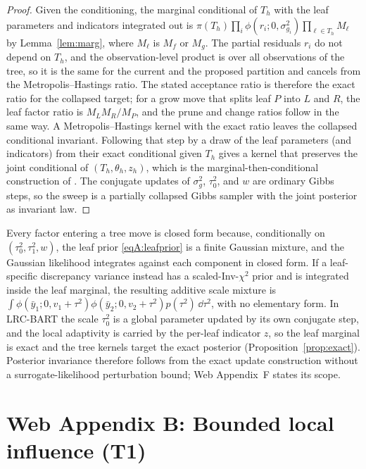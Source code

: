\begin{proof}
Given the conditioning, the marginal conditional of $T_h$ with the leaf parameters and indicators integrated out is $\pi(T_h)\prod_i\phi(r_i;0,\sigma^2_{g_i})\prod_{\ell\in T_h}M_\ell$ by Lemma~\ref{lem:marg}, where $M_\ell$ is $M_f$ or $M_g$. The partial residuals $r_i$ do not depend on $T_h$, and the observation-level product is over all observations of the tree, so it is the same for the current and the proposed partition and cancels from the Metropolis--Hastings ratio. The stated acceptance ratio is therefore the exact ratio for the collapsed target; for a grow move that splits leaf $P$ into $L$ and $R$, the leaf factor ratio is $M_LM_R/M_P$, and the prune and change ratios follow in the same way. A Metropolis--Hastings kernel with the exact ratio leaves the collapsed conditional invariant. Following that step by a draw of the leaf parameters (and indicators) from their exact conditional given $T_h$ gives a kernel that preserves the joint conditional of $(T_h,\theta_h,z_h)$, which is the marginal-then-conditional construction of \citet{Chipman2010BART}. The conjugate updates of $\sigma_g^2$, $\tau_0^2$, and $w$ are ordinary Gibbs steps, so the sweep is a partially collapsed Gibbs sampler with the joint posterior as invariant law.
\end{proof}

\begin{remA}\label{rem:nosurrogate}
Every factor entering a tree move is closed form because, conditionally on $(\tau_0^2,\tau_1^2,w)$, the leaf prior \eqref{eqA:leafprior} is a finite Gaussian mixture, and the Gaussian likelihood integrates against each component in closed form. If a leaf-specific discrepancy variance instead has a scaled-Inv-$\chi^2$ prior and is integrated inside the leaf marginal, the resulting additive scale mixture is $\int\phi(\bar y_1;0,v_1+\tau^2)\phi(\bar y_2;0,v_2+\tau^2)p(\tau^2)\,\dd\tau^2$, with no elementary form. In LRC-BART the scale $\tau_0^2$ is a global parameter updated by its own conjugate step, and the local adaptivity is carried by the per-leaf indicator $z$, so the leaf marginal is exact and the tree kernels target the exact posterior (Proposition~\ref{prop:exact}). Posterior invariance therefore follows from the exact update construction without a surrogate-likelihood perturbation bound; Web Appendix~F states its scope.
\end{remA}

\section*{Web Appendix B: Bounded local influence (T1)}

